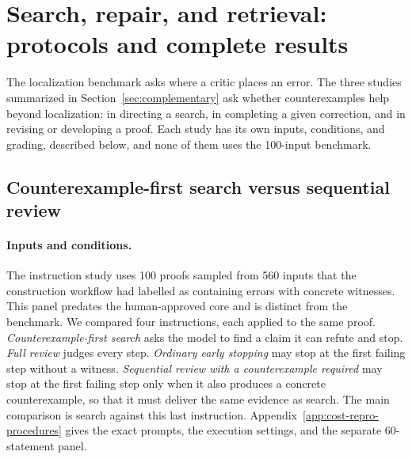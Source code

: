 \section{Search, repair, and retrieval: protocols and complete results}
\label{app:complementary-detail}
The localization benchmark asks where a critic places an error. The three studies summarized in Section~\ref{sec:complementary} ask whether counterexamples help beyond localization: in directing a search, in completing a given correction, and in revising or developing a proof. Each study has its own inputs, conditions, and grading, described below, and none of them uses the 100-input benchmark.

\subsection{Counterexample-first search versus sequential review}
\label{app:instruction-model-details}
\label{sec:cost-repro-design}
\label{sec:empirical-results}
\label{sec:triage-results}
\paragraph{Inputs and conditions.}
The instruction study uses 100 proofs sampled from 560 inputs that the construction workflow had labelled as containing errors with concrete witnesses. This panel predates the human-approved core and is distinct from the benchmark. We compared four instructions, each applied to the same proof. \emph{Counterexample-first search} asks the model to find a claim it can refute and stop. \emph{Full review} judges every step. \emph{Ordinary early stopping} may stop at the first failing step without a witness. \emph{Sequential review with a counterexample required} may stop at the first failing step only when it also produces a concrete counterexample, so that it must deliver the same evidence as search. The main comparison is search against this last instruction. Appendix~\ref{app:cost-repro-procedures} gives the exact prompts, the execution settings, and the separate 60-statement panel.

